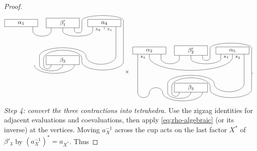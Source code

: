 \documentclass{amsart}
\begin{document}
\begin{proof}
\begin{align*}
{{\begin{tikzpicture}
\draw (.7-1,-.5) --++ (0,-.5) arc (-180:0:.55 and .3);
\draw (4-.7,-.5) --++ (0,-.4)  node [right=.015cm] {\tiny ${X_9}$} --++ (0,-.1) arc (0:-180:.9 and .3);
\draw (4,-.5) --++ (0,-.4) node [right=.015cm] {\tiny ${X_1}$} --++ (0,0);
\draw (4+.7,-.5) --++ (0,-2) arc (0:-180:.9 and .5) arc (0:180:1.4 and .5) --++ (0,-.55);
\draw (1.5-.7,0-.5) --++ (0,-.5);
\draw (1.5,0-.5)  --++ (0,-.5);
\draw (1.5+.7,0-.5) --++ (0,-.45) arc (-180:0:.225 and .15) --++ (0,.6) arc (180:0:1.25 and .3);
\draw (1.5-.35,-.6-.5) ;
\draw (1.5-.7,1.25-4) --++ (0,-.3) arc (0:-180:.225) --++ (0,.4) arc (180:0:1.15 and .5) --++ (0,-.2) arc (-180:0:1.25 and .5) --++ (0,2.5);
\draw (1.5,1.25-4) --++ (0,-.3) arc (0:-180:.7 and .35);
\draw (1.5+.7,1.25-4) --++ (0,-.3) arc (0:-180:1.2 and .5);
\draw (-1,-.5)  node [draw,fill=white,minimum width=2cm] {$\alpha_1$};
\draw (4,-.5)  node [draw,fill=white,minimum width=2cm] {$\alpha_4$};
\draw (1.5,0-.5) node [draw,fill=white,minimum width=2cm] {$\beta'_1$};
\draw (1.5,1.25-4) node [draw,fill=white,minimum width=2cm] {$\beta_2$};
\end{tikzpicture}}}
\mathbin{\times}
\vcenter{\hbox{
\begin{tikzpicture}
\draw (-.7-1,-4) --++ (0,-.4) node [right=.015cm] {\tiny ${X_5}$} --++ (0,-2.15) arc (-180:0:.35 and .3) arc (180:0:.4 and .3);
\draw (0-1,-4)--++ (0,-.4) arc (-180:0:2.5 and .8);
\draw (.7-1,-4) --++ (0,-.5) arc (-180:0:.55 and .3);
\draw (4-.7,-4) --++ (0,-.4)   node [right=.015cm] {\tiny ${X_7}$} --++ (0,-.1) arc (0:-180:.9 and .3);
\draw (4,-4) --++ (0,-.4)  node [right=.015cm] {\tiny ${X_2}$} --++ (0,0) ;
\draw (4+.7,-4) --++ (0,-2) arc (0:-180:.9 and .5) arc (0:180:1.4 and .5) --++ (0,-.55);
\draw (1.5-.7,-4) --++ (0,-.5);
\draw (1.5,-4)  --++ (0,-.5);
\draw (1.5+.7,-4) --++ (0,-.45) arc (-180:0:.225 and .15) --++ (0,.6) arc (180:0:1.25 and .3);
\draw (1.5-.35,-.6-4);
\draw (1.5-.7,1.25-8+.5) --++ (0,-.3) arc (0:-180:.225) --++ (0,.4) arc (180:0:1.15 and .5) --++ (0,-.2) arc (-180:0:1.25 and .5) --++ (0,2.5);
\draw (1.5,1.25-8+.5) --++ (0,-.3) arc (0:-180:.7 and .35);
\draw (1.5+.7,1.25-8+.5) --++ (0,-.3) arc (0:-180:1.2 and .5);
\draw (-1,-4)  node [draw,fill=white,minimum width=2cm] {$\alpha_2$};
\draw (4,-4)  node [draw,fill=white,minimum width=2cm] {$\alpha_5$};
\draw (1.5,-4) node [draw,fill=white,minimum width=2cm] {$\beta'_2$};
\draw (1.5,1.25-8+.5) node [draw,fill=white,minimum width=2cm] {$\beta_3$};
\end{tikzpicture}}}.
\end{align*}
\emph{Step 4: convert the three contractions into tetrahedra.} Use the zigzag identities for adjacent evaluations and coevaluations, then apply \eqref{eq:rho-algebraic} (or its inverse) at the vertices. Moving $a_X^{-1}$ across the cup acts on the last factor $X^*$ of $\beta'_3$ by $(a_X^{-1})^*=a_{X^*}$. Thus

\end{proof}
\end{document}
